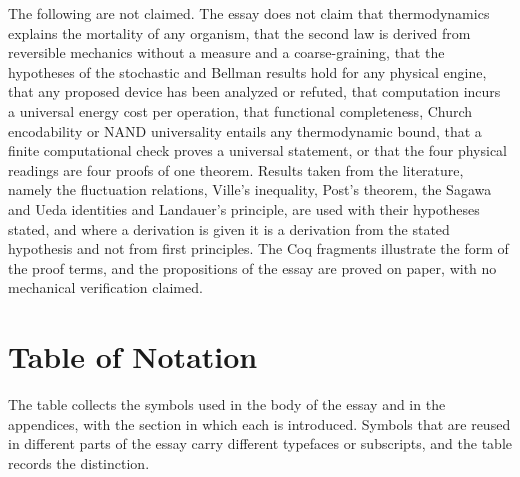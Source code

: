 \documentclass[11pt]{article}
\theoremstyle{definition}
\theoremstyle{remark}
\begin{document}
The following are not claimed. The essay does not claim that thermodynamics explains the mortality of any organism, that the second law is derived from reversible mechanics without a measure and a coarse-graining, that the hypotheses of the stochastic and Bellman results hold for any physical engine, that any proposed device has been analyzed or refuted, that computation incurs a universal energy cost per operation, that functional completeness, Church encodability or NAND universality entails any thermodynamic bound, that a finite computational check proves a universal statement, or that the four physical readings are four proofs of one theorem. Results taken from the literature, namely the fluctuation relations, Ville's inequality, Post's theorem, the Sagawa and Ueda identities and Landauer's principle, are used with their hypotheses stated, and where a derivation is given it is a derivation from the stated hypothesis and not from first principles. The Coq fragments illustrate the form of the proof terms, and the propositions of the essay are proved on paper, with no mechanical verification claimed.

\section{Table of Notation}\label{sec:notation}

The table collects the symbols used in the body of the essay and in the appendices, with the section in which each is introduced. Symbols that are reused in different parts of the essay carry different typefaces or subscripts, and the table records the distinction.
\end{document}
